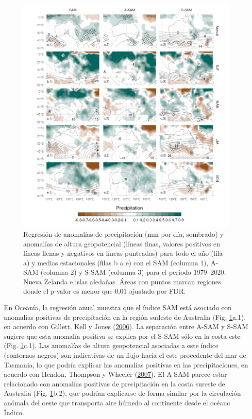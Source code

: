 \documentclass[12pt,oneside,a4paper]{reedthesis}
\begin{document}
\begin{figure}

{\centering \includegraphics{figures/30-sam/pp-regr-oceania-1} 

}

\caption{Regresión de anomalías de precipitación (mm por día, sombrado) y anomalías de altura geopotencial (líneas finas, valores positivos en líneas llenas y negativos en líneas punteadas) para todo el año (fila a) y medias estacionales (filas b a e) con el SAM (columna 1), A-SAM (columna 2) y S-SAM (columna 3) para el período 1979--2020. Nueva Zelanda e islas aledañas. Áreas con puntos marcan regiones donde el p-valor es menor que 0,01 ajustado por FDR.}\label{fig:pp-regr-oceania}
\end{figure}

En Oceanía, la regresión anual muestra que el índice SAM está asociado con anomalías positivas de precipitación en la región sudeste de Australia (Fig. \ref{fig:pp-regr-oceania}a.1), en acuerdo con Gillett, Kell y Jones (\protect\hyperlink{ref-gillett2006}{2006}).
La separación entre A-SAM y S-SAM sugiere que esta anomalía positiva se explica por el S-SAM sólo en la costa este (Fig. \ref{fig:pp-regr-oceania}c.1).
Las anomalías de altura geopotencial asociadas a este índice (contornos negros) son indicativas de un flujo hacia el este procedente del mar de Tasmania, lo que podría explicar las anomalías positivas en las precipitaciones, en acuerdo con Hendon, Thompson y Wheeler (\protect\hyperlink{ref-hendon2007}{2007}).
El A-SAM parece estar relacionado con anomalías positivas de precipitación en la costa sureste de Australia (Fig. \ref{fig:pp-regr-oceania}b.2), que podrían explicarse de forma similar por la circulación anómala del oeste que transporta aire húmedo al continente desde el océano Índico.
\end{document}

